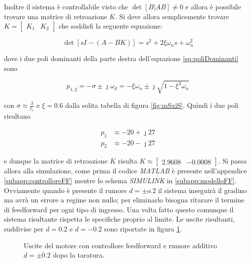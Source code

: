 		\noindent Inoltre il sistema è controllabile visto che $\det[B|AB]\ne 0$ e allora è possibile trovare una matrice di retroazione $K$. Si deve allora semplicemente trovare $K=\begin{bmatrix}K_1 & K_2 \end{bmatrix}$ che soddisfi la seguente equazione:
		
		\begin{equation}
			\det[sI-(A-BK)] = s^2 + 2\xi\omega_ns+\omega_n^2
			\label{eq:poliDominanti}
		\end{equation} 
		
		\noindent dove i due poli dominanti della parte destra dell'equazione \ref{eq:poliDominanti} sono
		
		\begin{equation*}
			p_{1,2}=-\sigma \pm \jmath\omega_d=-\xi\omega_n\pm\jmath\sqrt{1-\xi^2\omega_n}
		\end{equation*}
		
		\noindent con $\sigma\approx\frac{3}{t_s}$ e $\xi=0.6$ dalla solita tabella di figura \ref{fig:mSxiS}. Quindi i due poli risultano
		
		\begin{align*}
			p_1 &\approx -20 + \jmath 27 \\
			p_2 &\approx -20 - \jmath 27 
		\end{align*}
		
		\noindent e dunque la matrice di retroazione $K$ risulta $K\approx\begin{bmatrix}2.9608 & -0.0008\end{bmatrix}$. Si passa allora alla simulazione, come prima il codice \textit{MATLAB} è presente nell'appendice \ref{subapp:controlloreFF} mentre lo schema \textit{SIMULINK} in \ref{subapp:modelloFF}. Ovviamente quando è presente il rumore $d=\pm o.2$ il sistema inseguirà il gradino ma avrà un errore a regime non nullo; per eliminarlo bisogna ritarare il termine di feedforward per ogni tipo di ingresso. Una volta fatto questo comunque il sistema risultante rispetta le specifiche proprio al limite. Le uscite risultanti, suddivise per $d=0.2$ e $d=-0.2$ sono riportate in figura \ref{fig:FFd}.
		
		\begin{figure}[H]
			\centering
			 
			\caption{Uscite del motore con controllore feedforward e rumore additivo $d=\pm 0.2$ dopo la taratura.}
			\label{fig:FFd}		
		\end{figure}	
		
